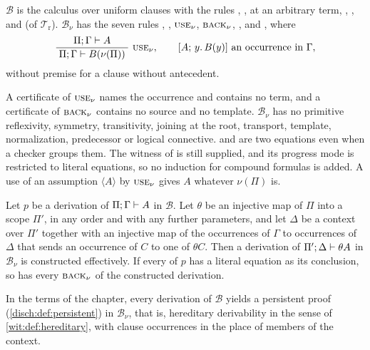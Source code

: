 \begin{definition}
\label{disch:def:alias-clause}
$\mathcal B$ is the calculus over uniform clauses with the rules
, ,  at an arbitrary term,
, ,  and  (of
$\mathcal T_{\mathrm r}$). $\mathcal B_{\nu}$ has the seven rules
, , $\rulename{Use}_{\nu}$,
$\rulename{Back}_{\nu}$, ,  and
, where
\begin{equation}
 \infrule{\Pi;\Gamma\proves A}{\Pi;\Gamma\proves B(\nu(\Pi))}\
 \rulename{Use}_{\nu},
 \qquad[A;\,y.\,B(y)]\text{ an occurrence in }\Gamma,
 \label{disch:eq:usenu}
\end{equation}
without premise for a clause without antecedent.
\end{definition}

A certificate of $\rulename{Use}_{\nu}$ names the occurrence and contains
no term, and a certificate of $\rulename{Back}_{\nu}$ contains no source
and no template. $\mathcal B_{\nu}$ has no primitive reflexivity, symmetry,
transitivity, joining at the root, transport, template, normalization,
predecessor or logical connective. \rulename{I0} and \rulename{IS} are two
equations even when a checker groups them. The witness of \rulename{Close}
is still supplied, and its progress mode is restricted to literal
equations, so no induction for compound formulas is added. A use of an
assumption $\langle A\rangle$ by $\rulename{Use}_{\nu}$ gives $A$ whatever
$\nu(\Pi)$ is.

\begin{theorem}
\label{disch:thm:alias-compiler}
Let $p$ be a derivation of $\Pi;\Gamma\vdash A$ in $\mathcal B$. Let
$\theta$ be an injective map of $\Pi$ into a scope $\Pi'$, in any order
and with any further parameters, and let $\Delta$ be a context over $\Pi'$
together with an injective map of the occurrences of $\Gamma$ to
occurrences of $\Delta$ that sends an occurrence of $C$ to one of $\theta
C$. Then a derivation of $\Pi';\Delta\vdash\theta A$ in $\mathcal B_{\nu}$
is constructed effectively. If every \rulename{Back} of $p$ has a literal
equation as its conclusion, so has every $\rulename{Back}_{\nu}$ of the
constructed derivation.
\end{theorem}

In the terms of the chapter, every derivation of $\mathcal B$ yields a
persistent proof (\cref{disch:def:persistent}) in $\mathcal B_{\nu}$, that
is, hereditary derivability in the sense of \cref{wit:def:hereditary},
with clause occurrences in the place of members of the context.

